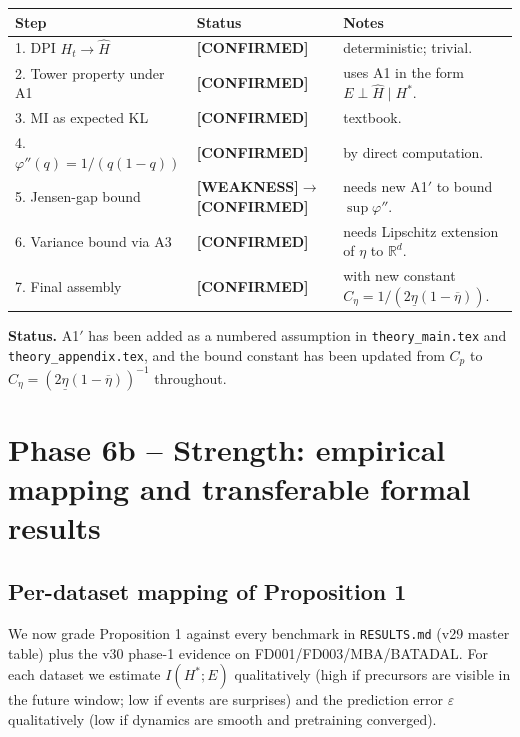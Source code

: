\documentclass[11pt]{article}
\newcommand{\R}{\mathbb{R}}
\newcommand{\CONF}{{\color{black!60!green}\textbf{[CONFIRMED]}}}
\newcommand{\WEAK}{{\color{red!60!black}\textbf{[WEAKNESS]}}}
\begin{document}
\begin{center}
\begin{tabular}{lll}
\toprule
Step & Status & Notes \\
\midrule
1. DPI $H_t\to\hat H$              & \CONF & deterministic; trivial. \\
2. Tower property under A1         & \CONF & uses A1 in the form $E\perp\hat H\mid H^*$. \\
3. MI as expected KL               & \CONF & textbook. \\
4. $\varphi''(q)=1/(q(1-q))$       & \CONF & by direct computation. \\
5. Jensen-gap bound                & \WEAK $\to$ \CONF & needs new A1$'$ to bound $\sup\varphi''$. \\
6. Variance bound via A3           & \CONF & needs Lipschitz extension of $\eta$ to $\R^d$. \\
7. Final assembly                  & \CONF & with new constant $C_\eta=1/(2\underline\eta(1-\overline\eta))$. \\
\bottomrule
\end{tabular}
\end{center}

\textbf{Status.} A1$'$ has been added as a numbered assumption in \texttt{theory\_main.tex} and \texttt{theory\_appendix.tex}, and the bound constant has been updated from $C_p$ to $C_\eta = (2\underline\eta(1-\overline\eta))^{-1}$ throughout.

\section{Phase 6b -- Strength: empirical mapping and transferable formal results}
\label{sec:phase6b}

\subsection{Per-dataset mapping of Proposition 1}

We now grade Proposition 1 against every benchmark in
\texttt{RESULTS.md} (v29 master table) plus the v30 phase-1 evidence on
FD001/FD003/MBA/BATADAL. For each dataset we estimate $I(H^*;E)$
qualitatively (high if precursors are visible in the future window;
low if events are surprises) and the prediction error $\varepsilon$
qualitatively (low if dynamics are smooth and pretraining converged).
\end{document}
